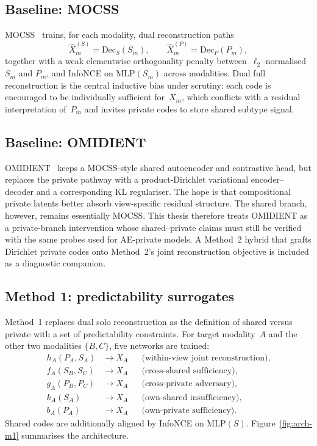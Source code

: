 \subsection{Baseline: MOCSS}

MOCSS~\citep{chen2023mocss} trains, for each modality, dual reconstruction paths
\begin{equation}
\hat{X}_m^{(S)}=\mathrm{Dec}_{S}(S_m),\qquad
\hat{X}_m^{(P)}=\mathrm{Dec}_{P}(P_m),
\end{equation}
together with a weak elementwise orthogonality penalty between~$\ell_2$-normalised $S_m$ and $P_m$, and InfoNCE on $\mathrm{MLP}(S_m)$ across modalities. Dual full reconstruction is the central inductive bias under scrutiny: each code is encouraged to be individually sufficient for~$X_m$, which conflicts with a residual interpretation of~$P_m$ and invites private codes to store shared subtype signal.

\subsection{Baseline: OMIDIENT}

OMIDIENT~\citep{Safinianaini_Välimäki_Bresson_Gorbonos_Rajamäki_Aaltonen_Marttinen_2025} keeps a MOCSS-style shared autoencoder and contrastive head, but replaces the private pathway with a product-Dirichlet variational encoder--decoder and a corresponding KL regulariser. The hope is that compositional private latents better absorb view-specific residual structure. The shared branch, however, remains essentially MOCSS. This thesis therefore treats OMIDIENT as a private-branch intervention whose shared--private claims must still be verified with the same probes used for AE-private models. A Method~2 hybrid that grafts Dirichlet private codes onto Method~2's joint reconstruction objective is included as a diagnostic companion.

\subsection{Method 1: predictability surrogates}

Method~1 replaces dual solo reconstruction as the definition of shared versus private with a set of predictability constraints. For target modality~$A$ and the other two modalities $\{B,C\}$, five networks are trained:
\begin{align}
h_A(P_A,S_A)&\rightarrow X_A && \text{(within-view joint reconstruction)},\\
f_A(S_B,S_C)&\rightarrow X_A && \text{(cross-shared sufficiency)},\\
g_A(P_B,P_C)&\rightarrow X_A && \text{(cross-private adversary)},\\
k_A(S_A)&\rightarrow X_A && \text{(own-shared insufficiency)},\\
b_A(P_A)&\rightarrow X_A && \text{(own-private sufficiency)}.
\end{align}
Shared codes are additionally aligned by InfoNCE on $\mathrm{MLP}(S)$. Figure~\ref{fig:arch-m1} summarises the architecture.

